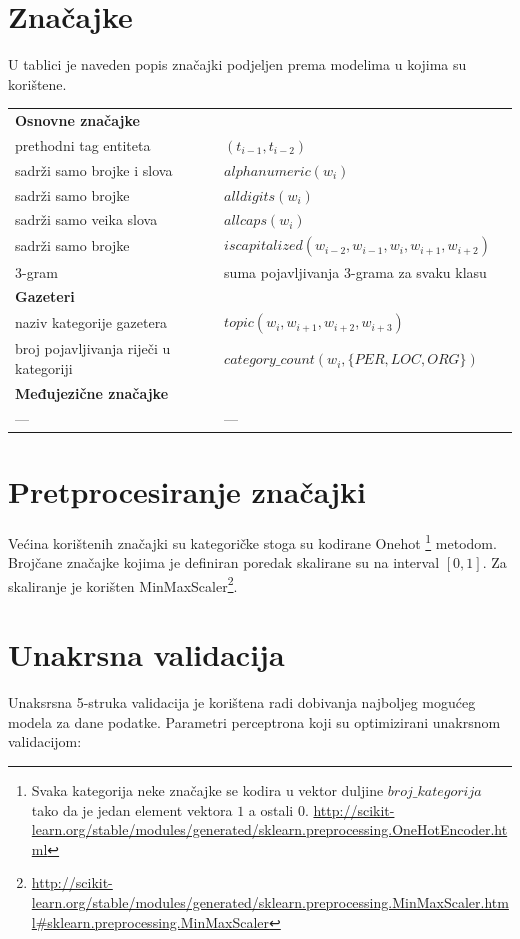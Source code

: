 \documentclass[times, utf8, seminar]{fer}
\begin{document}
\newpage

\section{Značajke}
U tablici je naveden popis značajki podjeljen prema modelima u kojima su korištene.

\begin{center}
\begin{tabular}{llr}
\hline
\textbf{Osnovne značajke} & \\
prethodni tag entiteta & $ (t_{i-1},t_{i-2}) $\\ 
sadrži samo brojke i slova & $ alphanumeric(w_i) $\\ 
sadrži samo brojke  & $ alldigits(w_i) $\\ 
sadrži samo veika slova & $ allcaps(w_i) $\\ 
sadrži samo brojke & $ iscapitalized(w_{i-2}, w_{i-1}, w_{i}, w_{i+1}, w_{i+2}) $\\
3-gram & suma pojavljivanja 3-grama za svaku klasu \\
\textbf{Gazeteri} & \\
naziv kategorije gazetera  & $ topic(w_{i}, w_{i+1}, w_{i+2}, w_{i+3}) $\\
broj pojavljivanja riječi u kategoriji & $ category\_count(w_{i}, \{PER, LOC, ORG\}) $\\
\textbf{Međujezične značajke} & \\
--- & ---\\

\hline
\end{tabular}
\end{center}

\section{Pretprocesiranje značajki}
Većina korištenih značajki su kategoričke stoga su kodirane Onehot \footnote{Svaka kategorija neke značajke se kodira u vektor duljine $ broj\_kategorija $ tako da je jedan element vektora $ 1 $ a ostali $ 0 $. \url{http://scikit-learn.org/stable/modules/generated/sklearn.preprocessing.OneHotEncoder.html}} metodom. Brojčane značajke kojima je definiran poredak skalirane su na interval $ [0,1] $. Za skaliranje je korišten MinMaxScaler\footnote{\url{http://scikit-learn.org/stable/modules/generated/sklearn.preprocessing.MinMaxScaler.html\#sklearn.preprocessing.MinMaxScaler}}.
\section{Unakrsna validacija}
Unaksrsna 5-struka validacija je korištena radi dobivanja najboljeg mogućeg modela za dane podatke. Parametri perceptrona koji su optimizirani unakrsnom validacijom: 
\end{document}
